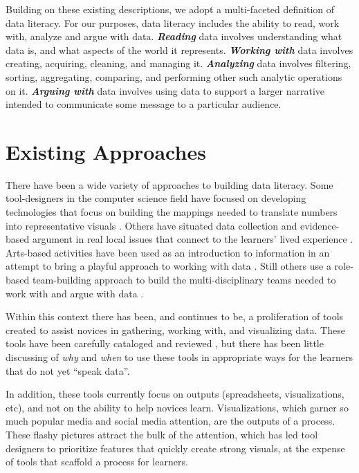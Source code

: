 \documentclass{acm_proc_article-sp}
\begin{document}
Building on these existing descriptions, we adopt a multi-faceted definition of data literacy.  For our purposes, data literacy includes the ability to read, work with, analyze and argue with data. \textbf{\textit{Reading}} data involves understanding what data is, and what aspects of the world it represents. \textbf{\textit{Working with}} data involves creating, acquiring, cleaning, and managing it. \textbf{\textit{Analyzing}} data involves filtering, sorting, aggregating, comparing, and performing other such analytic operations on it. \textbf{\textit{Arguing with}} data involves using data to support a larger narrative intended to communicate some message to a particular audience.

\section{Existing Approaches}

There have been a wide variety of approaches to building data literacy. Some tool-designers in the computer science field have focused on developing technologies that focus on building the mappings needed to translate numbers into representative visuals \cite{huron_constructive_2014}. Others have situated data collection and evidence-based argument in real local issues that connect to the learners' lived experience \cite{williams_city_2015}.  Arts-based activities have been used as an introduction to information in an attempt to bring a playful approach to working with data \cite{bhargava_data_2015}. Still others use a role-based team-building approach to build the multi-disciplinary teams needed to work with and argue with data \cite{school_2015}.

Within this context there has been, and continues to be, a proliferation of tools created to assist novices in gathering, working with, and visualizing data. These tools have been carefully cataloged and reviewed \cite{_visualizing_2014,othman_netstories_2015}, but there has been little discussing of \emph{why} and \emph{when} to use these tools in appropriate ways for the learners that do not yet \enquote{speak data}.

In addition, these tools currently focus on outputs (spreadsheets, visualizations, etc), and not on the ability to help novices learn.  Visualizations, which garner so much popular media and social media attention, are the outputs of a process. These flashy pictures attract the bulk of the attention, which has led tool designers to prioritize features that quickly create strong visuals, at the expense of tools that scaffold a process for learners.
\end{document}
